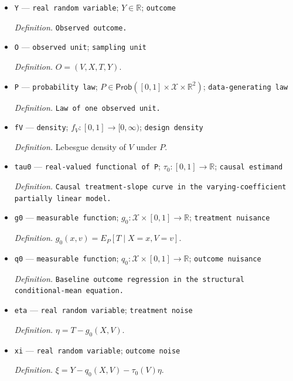 \documentclass{article}
\begin{document}
\begin{itemize}
  \par\smallskip\noindent\emph{Definition.} \texttt{Observed continuous treatment.}
  \item \texttt{Y} --- \texttt{real random variable}; \(Y\in\mathbb R\); \texttt{outcome}
  \par\smallskip\noindent\emph{Definition.} \texttt{Observed outcome.}
  \item \texttt{O} --- \texttt{observed unit}; \texttt{sampling unit}
  \par\smallskip\noindent\emph{Definition.} \(O=(V,X,T,Y)\).
  \item \texttt{P} --- \texttt{probability law}; \(P\in\mathsf{Prob}([0,1]\times\mathcal X\times\mathbb R^2)\); \texttt{data-\allowbreak{}generating law}
  \par\smallskip\noindent\emph{Definition.} \texttt{Law of one observed unit.}
  \item \texttt{fV} --- \texttt{density}; \(f_V:[0,1]\to[0,\infty)\); \texttt{design density}
  \par\smallskip\noindent\emph{Definition.} Lebesgue density of \(V\) under \(P\).
  \item \texttt{tau0} --- \texttt{real-\allowbreak{}valued functional of P}; \(\tau_0:[0,1]\to\mathbb R\); \texttt{causal estimand}
  \par\smallskip\noindent\emph{Definition.} \texttt{Causal treatment-\allowbreak{}slope curve in the varying-\allowbreak{}coefficient partially linear model.}
  \item \texttt{g0} --- \texttt{measurable function}; \(g_0:\mathcal X\times[0,1]\to\mathbb R\); \texttt{treatment nuisance}
  \par\smallskip\noindent\emph{Definition.} \(g_0(x,v)=E_P[T\mid X=x,V=v]\).
  \item \texttt{q0} --- \texttt{measurable function}; \(q_0:\mathcal X\times[0,1]\to\mathbb R\); \texttt{outcome nuisance}
  \par\smallskip\noindent\emph{Definition.} \texttt{Baseline outcome regression in the structural conditional-\allowbreak{}mean equation.}
  \item \texttt{eta} --- \texttt{real random variable}; \texttt{treatment noise}
  \par\smallskip\noindent\emph{Definition.} \(\eta=T-g_0(X,V)\).
  \item \texttt{xi} --- \texttt{real random variable}; \texttt{outcome noise}
  \par\smallskip\noindent\emph{Definition.} \(\xi=Y-q_0(X,V)-\tau_0(V)\eta\).

\end{itemize}
\end{document}
